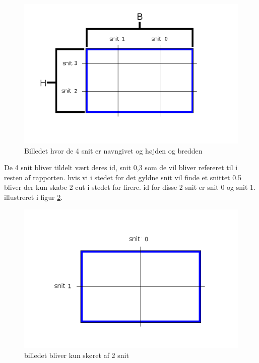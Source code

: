 \begin{figure}[h]
	\begin{center}
		\includegraphics[scale=0.42,angle=0]{afsnit/vores_implementation/billeder/naiv_algoritme/Cut}
	\end{center}
	\caption[]{Billedet hvor de 4 snit er navngivet og højden og bredden}
	\label{cut}
\end{figure}

De 4 snit bliver tildelt vært deres id, snit 0,3 som de vil bliver
refereret til i resten af rapporten. hvis vi i stedet for det gyldne snit
vil finde et snittet 0.5 bliver der kun skabe 2 cut i stedet for firere.
id for disse 2 snit er snit 0 og snit 1. illustreret i figur \ref{2Cut}.

\begin{figure}[h]
	\begin{center}
		\includegraphics[scale=0.42,angle=0]{afsnit/vores_implementation/billeder/naiv_algoritme/2Cut}
	\end{center}
	\caption[]{billedet bliver kun skøret af 2 snit}
	\label{2Cut}
\end{figure}

